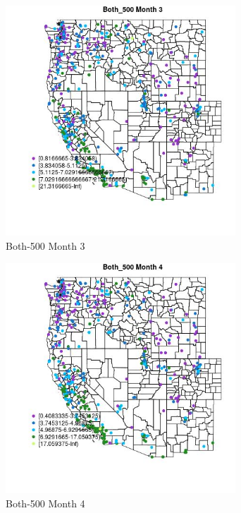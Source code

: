 \begin{figure} 
\centering  
\includegraphics[width=0.77\textwidth]{Code_Outputs/ML_input_report_ML_input_PM25_Step5_part_d_de_duplicated_aves_ML_input_MapObsMo3Both_500.jpg} 
\caption{\label{fig:ML_input_report_ML_input_PM25_Step5_part_d_de_duplicated_aves_ML_inputMapObsMo3Both_500}Both-500 Month 3} 
\end{figure} 
 

\begin{figure} 
\centering  
\includegraphics[width=0.77\textwidth]{Code_Outputs/ML_input_report_ML_input_PM25_Step5_part_d_de_duplicated_aves_ML_input_MapObsMo4Both_500.jpg} 
\caption{\label{fig:ML_input_report_ML_input_PM25_Step5_part_d_de_duplicated_aves_ML_inputMapObsMo4Both_500}Both-500 Month 4} 
\end{figure} 
 

